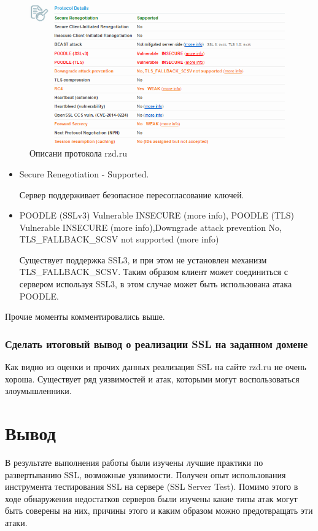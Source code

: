 \documentclass[11pt, a4paper]{article}		%
\begin{document}
\begin{figure}[h!]
\centering
\includegraphics[scale=0.8]{res/9}
\caption{Описани протокола rzd.ru}
\end{figure}

\begin{itemize}

\item Secure Renegotiation - Supported.

Сервер поддерживает безопасное пересогласование ключей.

\item POODLE (SSLv3)	Vulnerable   INSECURE (more info), POODLE (TLS)	Vulnerable   INSECURE (more info),Downgrade attack prevention	No, TLS\_FALLBACK\_SCSV not supported (more info)

Существует поддержка SSL3, и при этом не установлен механизм TLS\_FALLBACK\_SCSV. Таким образом клиент может соединиться с сервером используя SSL3, в этом случае может быть использована атака POODLE.

\end{itemize}

Прочие моменты комментировались выше.


\subsubsection{Сделать итоговый вывод о реализации SSL на заданном домене}

Как видно из оценки и прочих данных реализация SSL на сайте rzd.ru не очень хороша. Существует ряд уязвимостей и атак, которыми могут воспользоваться злоумышленники.


\section{Вывод}

В результате выполнения работы были изучены лучшие практики по развертыванию SSL, возможные уязвимости. Получен опыт использования инструмента тестирования SSL на сервере (SSL Server Test). Помимо этого в ходе обнаружения недостатков серверов были изучены какие типы атак могут быть соверены на них, причины этого и каким образом можно предотвращать эти атаки.
\end{document}
